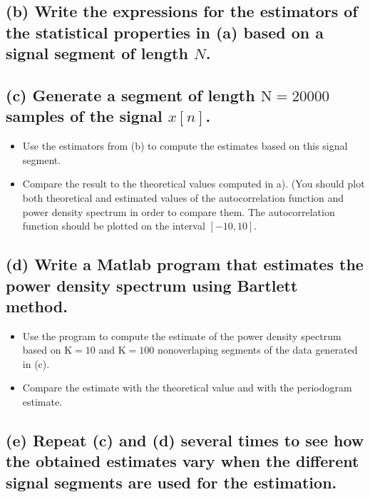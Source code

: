 \subsection*{(b) Write the expressions for the estimators of the statistical properties in (a) based on a signal segment of length $N$.}


\subsection*{(c) Generate a segment of length $\mathrm{N}=20000$ samples of the signal $x[n]$.}
\begin{itemize}
    \item Use the estimators from (b) to compute the estimates based on this signal segment.
    \item Compare the result to the theoretical values computed in a). (You should plot both theoretical and estimated values of the autocorrelation function and power density spectrum in order to compare them. The autocorrelation function should be plotted on the interval $[-10,10]$.
\end{itemize}


\subsection*{(d) Write a Matlab program that estimates the power density spectrum using Bartlett method.}
\begin{itemize}
    \item Use the program to compute the estimate of the power density spectrum based on $\mathrm{K}=10$ and $\mathrm{K}=100$ nonoverlaping segments of the data generated in (c).
    \item Compare the estimate with the theoretical value and with the periodogram estimate.
\end{itemize}


\subsection*{(e) Repeat (c) and (d) several times to see how the obtained estimates vary when the different signal segments are used for the estimation.}

